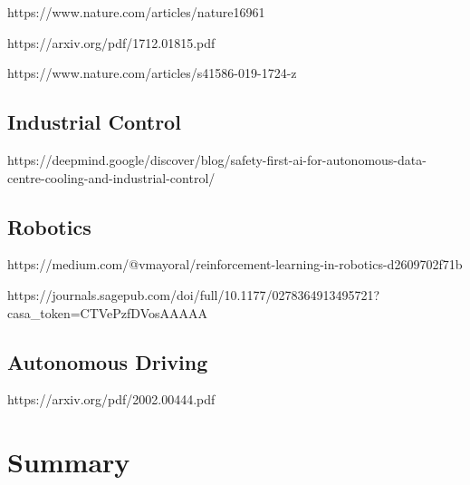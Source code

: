 https://www.nature.com/articles/nature16961

https://arxiv.org/pdf/1712.01815.pdf
 
https://www.nature.com/articles/s41586-019-1724-z


\subsection*{Industrial Control}

https://deepmind.google/discover/blog/safety-first-ai-for-autonomous-data-centre-cooling-and-industrial-control/ 


\subsection*{Robotics}

https://medium.com/@vmayoral/reinforcement-learning-in-robotics-d2609702f71b 


https://journals.sagepub.com/doi/full/10.1177/0278364913495721?casa_token=CTVePzfDVosAAAAA%


\subsection*{Autonomous Driving}

https://arxiv.org/pdf/2002.00444.pdf


\section{Summary}\label{sec:path-summary}
